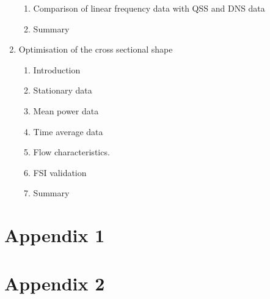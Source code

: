 \documentclass[authoryear,12pt]{article}
\begin{document}
\begin{enumerate}
\begin{enumerate}[i]
		\item Comparison of linear frequency data with QSS and DNS data
		\item Summary 
	\end{enumerate}		
	\item Optimisation of the cross sectional shape 
	\begin{enumerate}[i]
		\item Introduction 
		\item Stationary data 
		\item Mean power data 
		\item Time average data 
		\item Flow characteristics. 
		\item FSI validation
		\item Summary 
	\end{enumerate}
	
\end{enumerate}

\clearpage




\clearpage



\clearpage
\section*{\LARGE Appendix 1}
\label{app:manuscript}


\clearpage
\section*{\LARGE Appendix 2}

\end{document}
